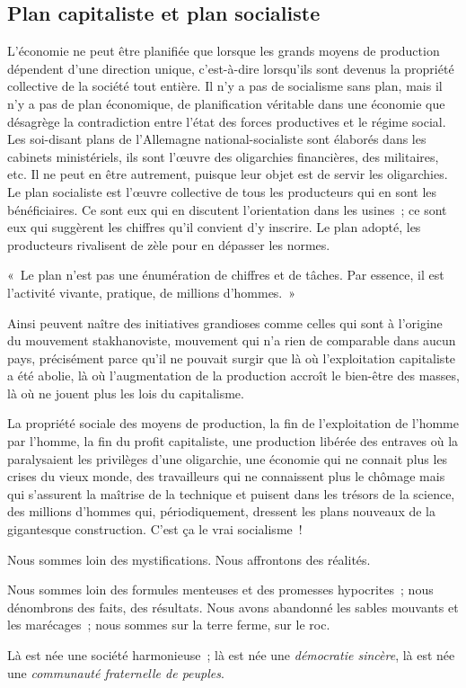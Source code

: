 \documentclass[french,twoside]{book} %
\newcommand{\bibl}[1]{{\RaggedLeft{#1}\par\bigskip}}
\newenvironment{quoteblock}%
  {\begin{quoting}}
  {\end{quoting}}
\newenvironment{quotebar}{%
    \def\FrameCommand{{\color{rubric!10!}\vrule width 0.5em} \hspace{0.9em}}%
    \def\OuterFrameSep{\itemsep} %
    \MakeFramed {\advance\hsize-\width \FrameRestore}
  }%
  {%
    \endMakeFramed
  }
\renewenvironment{quoteblock}%
  {%
    \savenotes
    \setstretch{0.9}
    \normalfont
    \begin{quotebar}
  }
  {%
    \end{quotebar}
    \spewnotes
  }
\begin{document}
\subsection[Plan capitaliste et plan socialiste]{Plan capitaliste et plan socialiste}
\noindent L’économie ne peut être planifiée que lorsque les grands moyens de production dépendent d’une direction unique, c’est-à-dire lorsqu’ils sont devenus la propriété collective de la société tout entière. Il n’y a pas de socialisme sans plan, mais il n’y a pas de plan économique, de planification véritable dans une économie que désagrège la contradiction entre l’état des forces productives et le régime social. Les soi-disant plans de l’Allemagne national-socialiste sont élaborés dans les cabinets ministériels, ils sont l’œuvre des oligarchies financières, des militaires, etc. Il ne peut en être autrement, puisque leur objet est de servir les oligarchies. Le plan socialiste est l’œuvre collective de tous les producteurs qui en sont les bénéficiaires. Ce sont eux qui en discutent l’orientation dans les usines ; ce sont eux qui suggèrent les chiffres qu’il convient d’y inscrire. Le plan adopté, les producteurs rivalisent de zèle pour en dépasser les normes.\par

\begin{quoteblock}
 \noindent « Le plan n’est pas une énumération de chiffres et de tâches. Par essence, il est l’activité vivante, pratique, de millions d’hommes. »\par
 
\bibl{(Staline)}
 \end{quoteblock}

\noindent Ainsi peuvent naître des initiatives grandioses comme celles qui sont à l’origine du mouvement stakhanoviste, mouvement qui n’a rien de comparable dans aucun pays, précisément parce qu’il ne pouvait surgir que là où l’exploitation capitaliste a été abolie, là où l’augmentation de la production accroît le bien-être des masses, là où ne jouent plus les lois du capitalisme.\par
La propriété sociale des moyens de production, la fin de l’exploitation de l’homme par l’homme, la fin du profit capitaliste, une production libérée des entraves où la paralysaient les privilèges d’une oligarchie, une économie qui ne connait plus les crises du vieux monde, des travailleurs qui ne connaissent plus le chômage mais qui s’assurent la maîtrise de la technique et puisent dans les trésors de la science, des millions d’hommes qui, périodiquement, dressent les plans nouveaux de la gigantesque construction. C’est ça le vrai socialisme !\par
Nous sommes loin des mystifications. Nous affrontons des réalités.\par
Nous sommes loin des formules menteuses et des promesses hypocrites ; nous dénombrons des faits, des résultats. Nous avons abandonné les sables mouvants et les marécages ; nous sommes sur la terre ferme, sur le roc.\par
Là est née une société harmonieuse ; là est née une \emph{démocratie sincère}, là est née une \emph{communauté fraternelle de peuples}.
\end{document}

